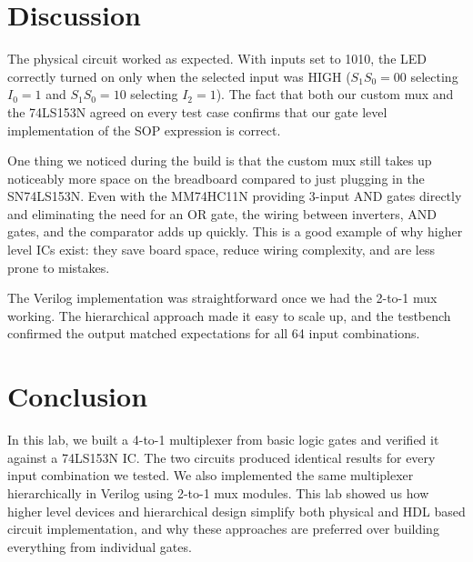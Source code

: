 \documentclass[12pt, letterpaper]{article}
\begin{document}
\section{Discussion}

The physical circuit worked as expected. With inputs set to 1010, the LED correctly turned on only when the selected input was HIGH ($S_1S_0 = 00$ selecting $I_0 = 1$ and $S_1S_0 = 10$ selecting $I_2 = 1$). The fact that both our custom mux and the 74LS153N agreed on every test case confirms that our gate level implementation of the SOP expression is correct.

One thing we noticed during the build is that the custom mux still takes up noticeably more space on the breadboard compared to just plugging in the SN74LS153N. Even with the MM74HC11N providing 3-input AND gates directly and eliminating the need for an OR gate, the wiring between inverters, AND gates, and the comparator adds up quickly. This is a good example of why higher level ICs exist: they save board space, reduce wiring complexity, and are less prone to mistakes.

The Verilog implementation was straightforward once we had the 2-to-1 mux working. The hierarchical approach made it easy to scale up, and the testbench confirmed the output matched expectations for all 64 input combinations.

\section{Conclusion}

In this lab, we built a 4-to-1 multiplexer from basic logic gates and verified it against a 74LS153N IC. The two circuits produced identical results for every input combination we tested. We also implemented the same multiplexer hierarchically in Verilog using 2-to-1 mux modules. This lab showed us how higher level devices and hierarchical design simplify both physical and HDL based circuit implementation, and why these approaches are preferred over building everything from individual gates.
\end{document}
